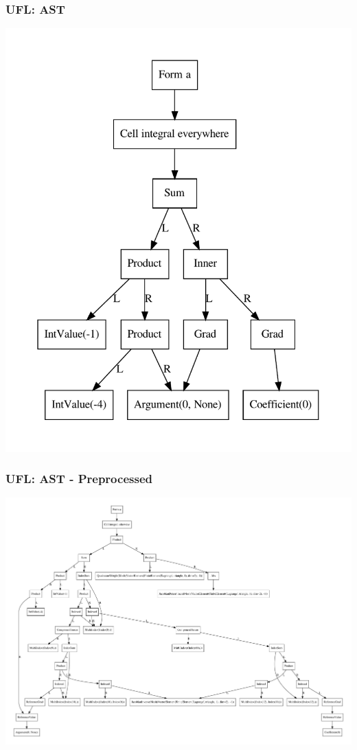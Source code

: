 \documentclass[aspectratio=169,11pt]{beamer}
\theoremstyle{definition}
\begin{document}
\begin{frame}
  \frametitle{UFL: AST}
  \centering
  \includegraphics[scale=0.4]{figures/ufl_ast.pdf}
\end{frame}

\begin{frame}
  \frametitle{UFL: AST - Preprocessed}
  \centering
  \includegraphics[scale=0.2]{figures/ufl_ast_preprocessed.pdf}
\end{frame}
\end{document}
